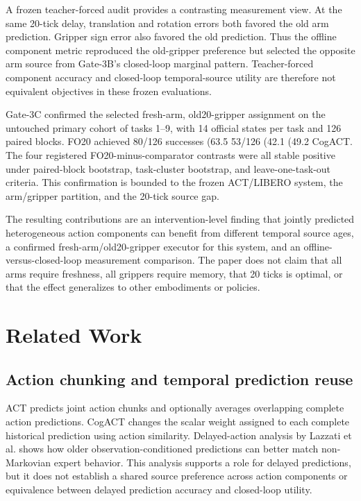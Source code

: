 A frozen teacher-forced audit provides a contrasting measurement view. At the
same 20-tick delay, translation and rotation errors both favored the old arm
prediction. Gripper sign error also favored the old prediction. Thus the
offline component metric reproduced the old-gripper preference but selected
the opposite arm source from Gate-3B's closed-loop marginal pattern.
Teacher-forced component accuracy and closed-loop temporal-source utility are
therefore not equivalent objectives in these frozen evaluations.

Gate-3C confirmed the selected fresh-arm, old20-gripper assignment on the
untouched primary cohort of tasks 1--9, with 14 official states per task and
126 paired blocks. FO20 achieved 80/126 successes (63.5%
53/126 (42.1%
(49.2%
CogACT. The four registered FO20-minus-comparator contrasts were all stable
positive under paired-block bootstrap, task-cluster bootstrap, and
leave-one-task-out criteria. This confirmation is bounded to the frozen
ACT/LIBERO system, the arm/gripper partition, and the 20-tick source gap.

The resulting contributions are an intervention-level finding that jointly
predicted heterogeneous action components can benefit from different temporal
source ages, a confirmed fresh-arm/old20-gripper executor for this system, and
an offline-versus-closed-loop measurement comparison. The paper does not claim
that all arms require freshness, all grippers require memory, that 20 ticks is
optimal, or that the effect generalizes to other embodiments or policies.

\section{Related Work}

\subsection{Action chunking and temporal prediction reuse}

ACT predicts joint action chunks and optionally averages overlapping complete
action predictions. CogACT changes the scalar weight assigned to each complete
historical prediction using action similarity. Delayed-action analysis by
Lazzati et al. shows how older observation-conditioned predictions can better
match non-Markovian expert behavior. This analysis supports a role for delayed
predictions, but it does not establish a shared source preference across action
components or equivalence between delayed prediction accuracy and closed-loop
utility.

